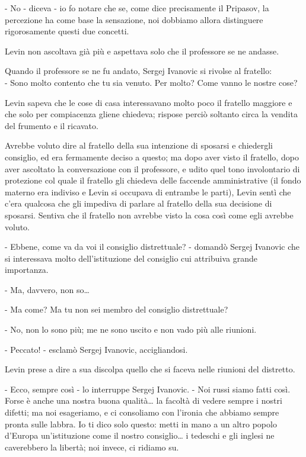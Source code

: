 - No - diceva - io fo notare che se, come dice precisamente il Pripasov, la percezione ha come base la sensazione, noi dobbiamo allora distinguere rigorosamente questi due concetti. 

Levin non ascoltava già più e aspettava solo che il professore se ne andasse. 

Quando il professore se ne fu andato, Sergej Ivanovic si rivolse al fratello: \\
- Sono molto contento che tu sia venuto. Per molto? Come vanno le nostre cose? 

Levin sapeva che le cose di casa interessavano molto poco il fratello maggiore e che solo per compiacenza gliene chiedeva; rispose perciò soltanto circa la vendita del frumento e il ricavato. 

Avrebbe voluto dire al fratello della sua intenzione di sposarsi e chiedergli consiglio, ed era fermamente deciso a questo; ma dopo aver visto il fratello, dopo aver ascoltato la conversazione con il professore, e udito quel tono involontario di protezione col quale il fratello gli chiedeva delle faccende amministrative (il fondo materno era indiviso e Levin si occupava di entrambe le parti), Levin sentì che c'era qualcosa che gli impediva di parlare al fratello della sua decisione di sposarsi. Sentiva che il fratello non avrebbe visto la cosa così come egli avrebbe voluto. 

- Ebbene, come va da voi il consiglio distrettuale? - domandò Sergej Ivanovic che si interessava molto dell'istituzione del consiglio cui attribuiva grande importanza. 

- Ma, davvero, non so\ldots{} 

- Ma come? Ma tu non sei membro del consiglio distrettuale? 

- No, non lo sono più; me ne sono uscito e non vado più alle riunioni. 

- Peccato! - esclamò Sergej Ivanovic, accigliandosi. 

Levin prese a dire a sua discolpa quello che si faceva nelle riunioni del distretto. 

- Ecco, sempre così - lo interruppe Sergej Ivanovic. - Noi russi siamo fatti così. Forse è anche una nostra buona qualità\ldots{} la facoltà di vedere sempre i nostri difetti; ma noi esageriamo, e ci consoliamo con l'ironia che abbiamo sempre pronta sulle labbra. Io ti dico solo questo: metti in mano a un altro popolo d'Europa un'istituzione come il nostro consiglio\ldots{} i tedeschi e gli inglesi ne caverebbero la libertà; noi invece, ci ridiamo su. 

